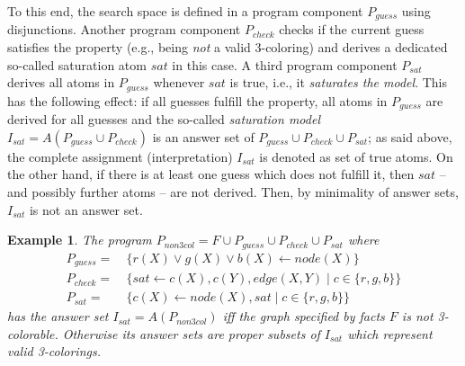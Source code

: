 \documentclass[11pt,fleqn,twoside]{article}
\newtheorem{example}{Example}
\begin{document}
		To this end, the search space is defined in a program component $P_{\mathit{guess}}$ using disjunctions.
		Another program component $P_{\mathit{check}}$ checks if the current guess satisfies the property (e.g., being \emph{not} a valid 3-coloring) and derives a dedicated so-called saturation atom $\mathit{sat}$ in this case.
		A third program component $P_{\mathit{sat}}$ derives all atoms in $P_{\mathit{guess}}$ whenever $\mathit{sat}$ is true, i.e., it \emph{saturates the model}.
		This has the following effect: if all guesses fulfill the property, all atoms in $P_{\mathit{guess}}$ are derived for all guesses
		and the so-called \emph{saturation model} $I_{\mathit{sat}} = A(P_{\mathit{guess}} \cup P_{\mathit{check}})$ is an answer set of $P_{\mathit{guess}} \cup P_{\mathit{check}} \cup P_{\mathit{sat}}$;
		as said above, the complete assignment (interpretation) $I_{\mathit{sat}}$ is denoted as set of true atoms.
		On the other hand, if there is at least one guess which does not fulfill it, then $\mathit{sat}$ -- and possibly further atoms -- are not derived. Then, by minimality of answer sets, $I_{\mathit{sat}}$ is not an answer set.
		
		\begin{example}
			\label{ex:non3col}
			The program $P_{\mathit{non3col}} = F \cup P_{\mathit{guess}} \cup P_{\mathit{check}} \cup P_{\mathit{sat}}$ where
			{
			\begin{align*}
				P_{\mathit{guess}} = & \ \{ r(X) \vee g(X) \vee b(X) \leftarrow \mathit{node}(X) \} \\
				P_{\mathit{check}} = & \ \{ \mathit{sat} \leftarrow c(X), c(Y), \mathit{edge}(X,Y) \mid c \in \{ \mathit{r}, \mathit{g}, \mathit{b} \} \} \\
				P_{\mathit{sat}} = & \ \{ c(X) \leftarrow \mathit{node}(X), \mathit{sat} \mid c \in \{ \mathit{r}, \mathit{g}, \mathit{b} \} \}
			\end{align*}
			}
			has the answer set $I_{\mathit{sat}} = A(P_{\mathit{non3col}})$ iff the graph specified by facts $F$ is not 3-colorable.
			Otherwise its answer sets are proper subsets of $I_{\mathit{sat}}$ which represent valid 3-colorings.
		\end{example}
\end{document}

